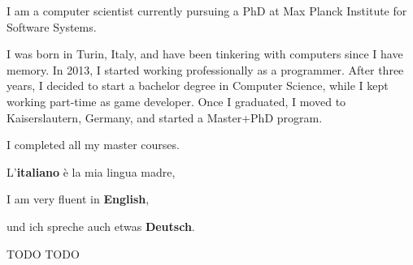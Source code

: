 


I am a computer scientist currently pursuing a PhD at Max Planck Institute for Software Systems. 

I was born in Turin, Italy, and have been tinkering with computers since I have memory. In 2013, I started working professionally as a programmer. After three years, I decided to start a bachelor degree in Computer Science, while I kept working part-time as game developer. Once I graduated, I moved to Kaiserslautern, Germany, and started a Master+PhD program.

I completed all my master courses. 


L'\textbf{italiano} è la mia lingua madre,

I am very fluent in \textbf{English},

und ich spreche auch etwas \textbf{Deutsch}.


TODO TODO


